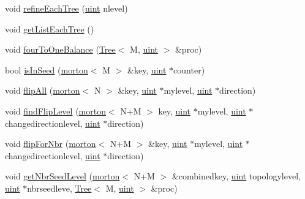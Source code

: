 \begin{DoxyCompactItemize}
\item 
void \mbox{\hyperlink{classForest_a91235963450922043ca3bb067b2893d3}{refine\+Each\+Tree}} (\mbox{\hyperlink{definitions_8h_a69aa29b598b851b0640aa225a9e5d61d}{uint}} nlevel)
\item 
void \mbox{\hyperlink{classForest_a208c4dce0d2aeda8aa501852667290eb}{get\+List\+Each\+Tree}} ()
\item 
void \mbox{\hyperlink{classForest_aec1673fba6a68aa0a1da57526370f2f2}{four\+To\+One\+Balance}} (\mbox{\hyperlink{classTree}{Tree}}$<$ M, \mbox{\hyperlink{definitions_8h_a69aa29b598b851b0640aa225a9e5d61d}{uint}} $>$ \&proc)
\item 
bool \mbox{\hyperlink{classForest_a7c5750aeea54c572658a475dd1e67123}{is\+In\+Seed}} (\mbox{\hyperlink{definitions_8h_af8682350bd8bb38ee9023f7a0a310add}{morton}}$<$ M $>$ \&key, \mbox{\hyperlink{definitions_8h_a69aa29b598b851b0640aa225a9e5d61d}{uint}} $\ast$counter)
\item 
void \mbox{\hyperlink{classForest_a8352dba9dd05111be3b6a4405d5f0425}{flip\+All}} (\mbox{\hyperlink{definitions_8h_af8682350bd8bb38ee9023f7a0a310add}{morton}}$<$ N $>$ \&key, \mbox{\hyperlink{definitions_8h_a69aa29b598b851b0640aa225a9e5d61d}{uint}} $\ast$mylevel, \mbox{\hyperlink{definitions_8h_a69aa29b598b851b0640aa225a9e5d61d}{uint}} $\ast$direction)
\item 
void \mbox{\hyperlink{classForest_a9f4c2ca62b32666e84a7d546ae28e996}{find\+Flip\+Level}} (\mbox{\hyperlink{definitions_8h_af8682350bd8bb38ee9023f7a0a310add}{morton}}$<$ N+M $>$ key, \mbox{\hyperlink{definitions_8h_a69aa29b598b851b0640aa225a9e5d61d}{uint}} $\ast$mylevel, \mbox{\hyperlink{definitions_8h_a69aa29b598b851b0640aa225a9e5d61d}{uint}} $\ast$changedirectionlevel, \mbox{\hyperlink{definitions_8h_a69aa29b598b851b0640aa225a9e5d61d}{uint}} $\ast$direction)
\item 
void \mbox{\hyperlink{classForest_aaf141e0d99b8ca26265b1dfa57c12793}{flip\+For\+Nbr}} (\mbox{\hyperlink{definitions_8h_af8682350bd8bb38ee9023f7a0a310add}{morton}}$<$ N+M $>$ \&key, \mbox{\hyperlink{definitions_8h_a69aa29b598b851b0640aa225a9e5d61d}{uint}} $\ast$mylevel, \mbox{\hyperlink{definitions_8h_a69aa29b598b851b0640aa225a9e5d61d}{uint}} $\ast$changedirectionlevel, \mbox{\hyperlink{definitions_8h_a69aa29b598b851b0640aa225a9e5d61d}{uint}} $\ast$direction)
\item 
void \mbox{\hyperlink{classForest_a6f48fa95717bacc408f688da16255b55}{get\+Nbr\+Seed\+Level}} (\mbox{\hyperlink{definitions_8h_af8682350bd8bb38ee9023f7a0a310add}{morton}}$<$ N+M $>$ \&combinedkey, \mbox{\hyperlink{definitions_8h_a69aa29b598b851b0640aa225a9e5d61d}{uint}} topologylevel, \mbox{\hyperlink{definitions_8h_a69aa29b598b851b0640aa225a9e5d61d}{uint}} $\ast$nbrseedleve, \mbox{\hyperlink{classTree}{Tree}}$<$ M, \mbox{\hyperlink{definitions_8h_a69aa29b598b851b0640aa225a9e5d61d}{uint}} $>$ \&proc)

\end{DoxyCompactItemize}
